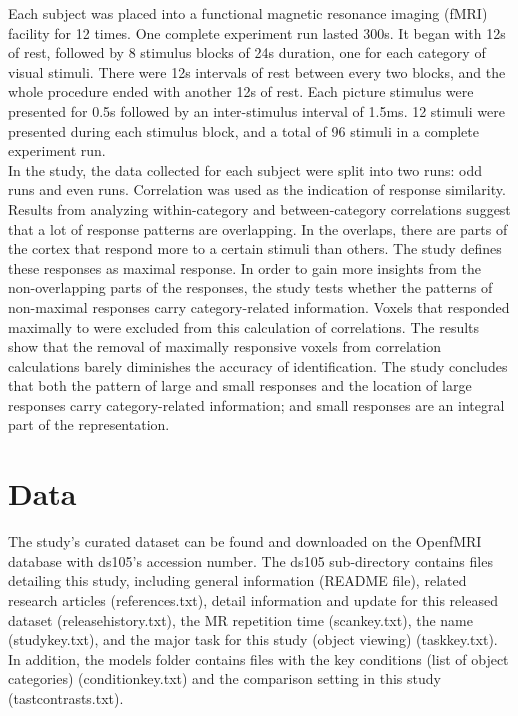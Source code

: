 \documentclass[11pt,twocolumn]{article}
\begin{document}
Each subject was placed into a functional magnetic resonance imaging 
(fMRI) facility for 12 times. One complete experiment run lasted 300s. It began 
with 12s of rest, followed by 8 stimulus blocks of 24s duration, one for 
each category of visual stimuli. There were 12s intervals of rest between 
every two blocks, and the whole procedure ended with another 12s of rest. 
Each picture stimulus were presented for 0.5s followed by an inter-stimulus 
interval of 1.5ms. 12 stimuli were presented during each stimulus 
block, and a total of 96 stimuli in a complete experiment run.\\

In the study, the data collected for each subject were split into two 
runs: odd runs and even runs. Correlation was used as the indication of 
response similarity. Results from analyzing within-category and 
between-category correlations suggest that a lot of response patterns 
are overlapping. In the overlaps, there are parts of the cortex that respond 
more to a certain stimuli than others. The study defines these responses as 
maximal response. In order to gain more insights from the non-overlapping 
parts of the responses, the study tests whether the patterns of non-maximal 
responses carry category-related information. Voxels that responded maximally 
to were excluded from this calculation of correlations. The results show that the 
removal of maximally responsive voxels from correlation calculations 
barely diminishes the accuracy of identification. The study concludes 
that both the pattern of large and small responses and the location 
of large responses carry category-related information; and small responses 
are an integral part of the representation.\\

\section{Data}

The study's curated dataset can be found and downloaded on the OpenfMRI 
database with ds105's accession number. The ds105 
sub-directory contains files detailing this study, including general information 
(README file), related research articles (references.txt), detail information 
and update for this released dataset (release\textunderscore history.txt), 
the MR repetition time (scan\textunderscore key.txt), the name 
(study\textunderscore key.txt), and the major task for this study 
(object viewing) (task\textunderscore key.txt). In addition, the models folder 
contains files with the key conditions (list of object categories) 
(condition\textunderscore key.txt) and the comparison setting in this study 
(tast\textunderscore contrasts.txt). \\
\end{document}
